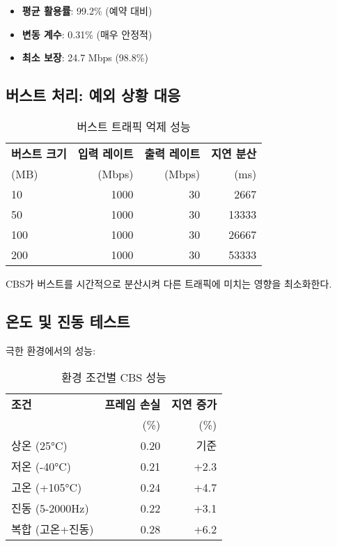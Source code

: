 \documentclass[twocolumn,10pt]{article}
\begin{document}
\begin{itemize}
    \item \textbf{평균 활용률}: 99.2\% (예약 대비)
    \item \textbf{변동 계수}: 0.31\% (매우 안정적)
    \item \textbf{최소 보장}: 24.7 Mbps (98.8\%)
\end{itemize}

\subsection{버스트 처리: 예외 상황 대응}

\begin{table}[h]
\centering
\caption{버스트 트래픽 억제 성능}
\label{tab:burst_suppression}
\begin{tabular}{lrrr}
\toprule
\textbf{버스트 크기} & \textbf{입력 레이트} & \textbf{출력 레이트} & \textbf{지연 분산} \\
(MB) & (Mbps) & (Mbps) & (ms) \\
\midrule
10 & 1000 & 30 & 2667 \\
50 & 1000 & 30 & 13333 \\
100 & 1000 & 30 & 26667 \\
200 & 1000 & 30 & 53333 \\
\bottomrule
\end{tabular}
\end{table}

CBS가 버스트를 시간적으로 분산시켜 다른 트래픽에 미치는 영향을 최소화한다.

\subsection{온도 및 진동 테스트}

극한 환경에서의 성능:

\begin{table}[h]
\centering
\caption{환경 조건별 CBS 성능}
\label{tab:environmental}
\begin{tabular}{lrr}
\toprule
\textbf{조건} & \textbf{프레임 손실} & \textbf{지연 증가} \\
 & (\%) & (\%) \\
\midrule
상온 (25°C) & 0.20 & 기준 \\
저온 (-40°C) & 0.21 & +2.3 \\
고온 (+105°C) & 0.24 & +4.7 \\
진동 (5-2000Hz) & 0.22 & +3.1 \\
복합 (고온+진동) & 0.28 & +6.2 \\
\bottomrule
\end{tabular}
\end{table}
\end{document}
